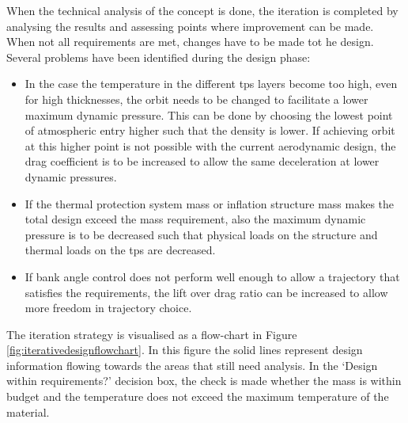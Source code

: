 When the technical analysis of the concept is done, the iteration is completed by analysing the results and assessing points where improvement can be made. When not all requirements are met, changes have to be made tot he design. Several problems have been identified during the design phase:
\begin{itemize}
	\item In the case the temperature in the different \gls{tps} layers become too high, even for high thicknesses, the orbit needs to be changed to facilitate a lower maximum dynamic pressure. This can be done by choosing the lowest point of atmospheric entry higher such that the density is lower. If achieving orbit at this higher point is not possible with the current aerodynamic design, the drag coefficient is to be increased to allow the same deceleration at lower dynamic pressures.
	
	\item If the thermal protection system mass or inflation structure mass makes the total design exceed the mass requirement, also the maximum dynamic pressure is to be decreased such that physical loads on the structure and thermal loads on the \gls{tps} are decreased.
	
	\item If bank angle control does not perform well enough to allow a trajectory that satisfies the requirements, the lift over drag ratio can be increased to allow more freedom in trajectory choice.
	
	
\end{itemize}

The iteration strategy is visualised as a flow-chart in Figure \ref{fig:iterativedesignflowchart}. In this figure the solid lines represent design information flowing towards the areas that still need analysis. In the `Design within requirements?' decision box, the check is made whether the mass is within budget and the temperature does not exceed the maximum temperature of the material.





